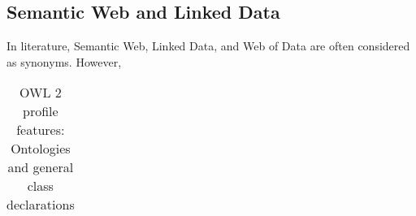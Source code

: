 \subsection{Semantic Web and Linked Data}


In literature, Semantic Web, Linked Data, and Web of Data are often considered as synonyms.
However, 


\begin{table*}[t]
\footnotesize
    \centering
    \caption{OWL 2 profile features: Ontologies and general class declarations}
    \label{tab:owl-2-profiles-general}
    

    \begin{threeparttable}    
        \begin{tabu} to \textwidth { X[5l] X[10l] X[9l] X[c] X[c] X[c] X[c] }
        

\end{tabu}
\end{threeparttable}
\end{table*}
